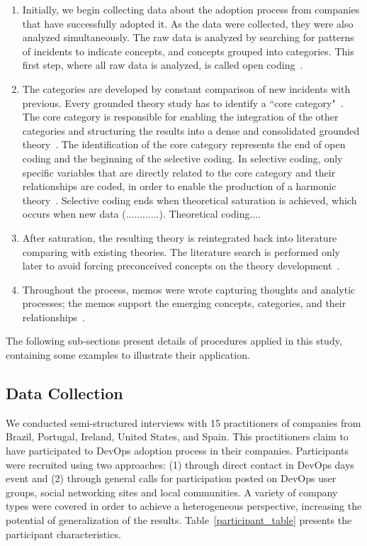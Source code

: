 \begin{enumerate}[label=(\Alph*)]
\item Initially, we begin collecting data about the adoption process from
companies that have successfully adopted it. As the data were collected, they
were also analyzed simultaneously. The raw data is analyzed by searching for
patterns of incidents to indicate concepts, and concepts grouped into
categories. This first step, where all raw data is analyzed, is called open
coding~\cite{stol2016grounded}.

\item The categories are developed by constant comparison of new incidents with
previous. Every grounded theory study has to identify a ``core category"~\cite{stol2016grounded}.
The core category is responsible for enabling the
integration of the other categories and structuring the results into a dense
and consolidated grounded theory~\cite{jantunen2014using}. The identification
of the core category represents the end of open coding and the beginning of the
selective coding. In selective coding, only specific variables that are
directly related to the core category and their relationships are coded, in
order to enable the production of a harmonic theory~\cite{coleman2007using,hoda2011impact}.
Selective coding ends when theoretical saturation is achieved, which occurs when new data (............). Theoretical coding....

\item After saturation, the resulting theory is reintegrated back into
literature comparing with existing theories. The literature search is performed
only later to avoid forcing preconceived concepts on the theory development~\cite{adolph2012reconciling}.

\item Throughout the process, memos were wrote capturing thoughts and analytic
processes; the memos support the emerging concepts, categories, and their
relationships~\cite{adolph2012reconciling}.
\end{enumerate}


The following sub-sections present details of procedures applied in this study,
containing some examples to illustrate their application.

\subsection{Data Collection}
We conducted semi-structured interviews with 15 practitioners of companies from
Brazil, Portugal, Ireland, United States, and Spain. This practitioners claim
to have participated to DevOps adoption process in their companies. Participants
were recruited using two approaches: (1) through direct contact in DevOps days event
and (2) through  general
calls for participation posted on DevOps user groups, social networking sites
and local communities. A variety of company types were covered in order to
achieve a heterogeneous perspective, increasing the potential of generalization
of the results. Table~\ref{participant_table} presents the participant
characteristics.


